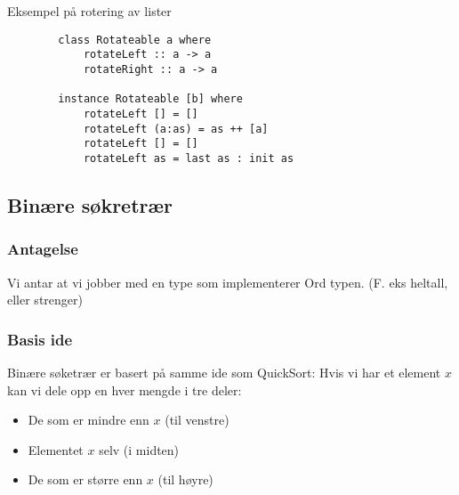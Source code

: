 \documentclass{article}
\begin{document}
    \begin{eg}
        Eksempel på rotering av lister
        \begin{lstlisting}
        class Rotateable a where 
            rotateLeft :: a -> a
            rotateRight :: a -> a

        instance Rotateable [b] where
            rotateLeft [] = []
            rotateLeft (a:as) = as ++ [a]
            rotateLeft [] = []
            rotateLeft as = last as : init as 
        \end{lstlisting}
    \end{eg}

    \subsection{Binære søkretrær}

    \subsubsection{Antagelse}
    Vi antar at vi jobber med en type som implementerer Ord typen. (F. eks heltall, eller strenger)
    \subsubsection{Basis ide}
    Binære søketrær er basert på samme ide som QuickSort: Hvis vi har et element \( x \) kan vi dele opp en hver mengde i tre deler:

    \begin{itemize}
        \item De som er mindre enn \( x \) (til venstre)
        \item Elementet \( x \) selv (i midten)
        \item De som er større enn \( x \) (til høyre)
    \end{itemize}
\end{document}
